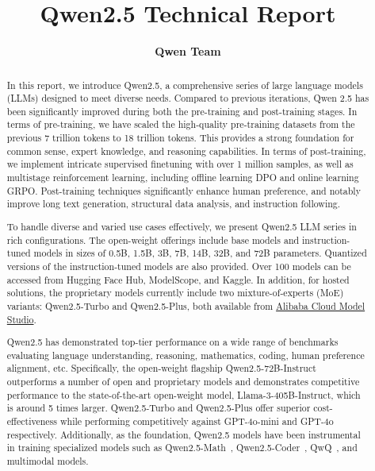 \documentclass{article} %
\title{Qwen2.5 Technical Report}
\author{
\bf Qwen Team
}
\begin{document}
\maketitle

\begin{abstract}

In this report, we introduce Qwen2.5, a comprehensive series of large language models (LLMs) designed to meet diverse needs. 
Compared to previous iterations, Qwen 2.5 has been significantly improved during both the pre-training and post-training stages. 
In terms of pre-training, we have scaled the high-quality pre-training datasets from the previous 7 trillion tokens to 18 trillion tokens.
This provides a strong foundation for %
common sense, expert knowledge, and reasoning capabilities.
In terms of post-training, we implement intricate supervised finetuning with over 1 million samples, as well as multistage reinforcement learning, including offline learning DPO and online learning GRPO. 
Post-training techniques significantly enhance human preference, and notably improve long text generation, structural data analysis, and instruction following.

\smallskip
To handle diverse and varied use cases effectively, 
we present Qwen2.5 LLM series in rich configurations.
The open-weight offerings include base models and instruction-tuned models in sizes of 0.5B, 1.5B, 3B, 7B, 14B, 32B, and 72B parameters. Quantized versions of the instruction-tuned models are also provided. Over 100 models can be accessed from Hugging Face Hub, ModelScope, and Kaggle.
In addition, for hosted solutions, the proprietary models currently include two mixture-of-experts (MoE) variants: Qwen2.5-Turbo and Qwen2.5-Plus, both available from \href{https://www.alibabacloud.com/en/product/modelstudio}{Alibaba Cloud Model Studio}.


Qwen2.5 has demonstrated top-tier performance on a wide range of benchmarks evaluating language understanding, reasoning, mathematics, coding, human preference alignment, etc. Specifically, the open-weight flagship Qwen2.5-72B-Instruct outperforms a number of open and proprietary models and demonstrates competitive performance to the state-of-the-art open-weight model, Llama-3-405B-Instruct, which is around 5 times larger.
Qwen2.5-Turbo and Qwen2.5-Plus offer superior cost-effectiveness while performing competitively against GPT-4o-mini and GPT-4o respectively.
Additionally, as the foundation, Qwen2.5 models have been instrumental in training specialized models such as Qwen2.5-Math~\citep{qwen2.5math}, Qwen2.5-Coder~\citep{qwen2.5coder}, QwQ~\citep{qwq}, and multimodal models.




\end{abstract}
\end{document}

